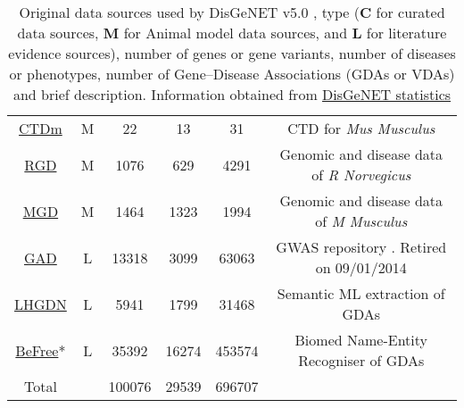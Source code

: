 \begin{table}[H]
{\begin{tabular}{c|c|c|c|c|c}
    \href{https://goo.gl/aTyMBE}{CTDm} &
    M & 22 & 13 & 31 &
    CTD for \textit{Mus Musculus} \cite{ctd2017} \\
    
    \href{https://goo.gl/zc52JW}{RGD} &
    M & 1076 & 629 & 4291 &
    Genomic and disease data of \textit{R Norvegicus} \cite{rgd2015} \\
    
    \href{https://goo.gl/iTNmRx}{MGD} &
    M & 1464 & 1323 & 1994 &
    Genomic and disease data of \textit{M Musculus} \cite{mgd2015} \\
    
    \href{https://goo.gl/y3keCN}{GAD} &
    L & 13318 & 3099 & 63063 &
    GWAS repository \cite{gad2004}. Retired on 09/01/2014 \\
    
    \href{https://goo.gl/szDDw6}{LHGDN} &
    L & 5941 & 1799 & 31468 &
    Semantic ML extraction of GDAs \cite{bundschus2008} \\
    
    \href{https://goo.gl/4Yau27}{BeFree}* &
    L & 35392 & 16274 & 453574 &
    Biomed Name-Entity Recogniser of GDAs \cite{bravo2015} \\
    
    Total &  & 100076 & 29539 & 696707 \\
    
    \end{tabular}}
    \caption{Original data sources used by DisGeNET v5.0 \cite{DisGeNET2015}, type (\textbf{C} for curated data sources, \textbf{M} for Animal model data sources, and \textbf{L} for literature evidence sources), number of genes or gene variants, number of diseases or phenotypes, number of Gene--Disease Associations (GDAs or VDAs) and brief description. Information obtained from
    \href{https://goo.gl/ntXTjX}{DisGeNET statistics} \label{tab:disgenet_data}}
\end{table}